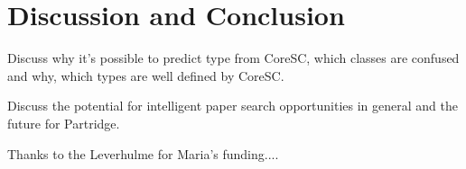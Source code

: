 \documentclass{svmult}
\begin{document}
%
%
%
%
%


\section{Discussion and Conclusion}
\label{sec:4}

Discuss why it's possible to predict type from CoreSC, which classes are confused and why, which types are well defined by CoreSC. 

Discuss the potential for intelligent paper search opportunities in general and the future for Partridge.

\begin{acknowledgement}
Thanks to the Leverhulme for Maria's funding....
\end{acknowledgement}
%





%
\end{document}
